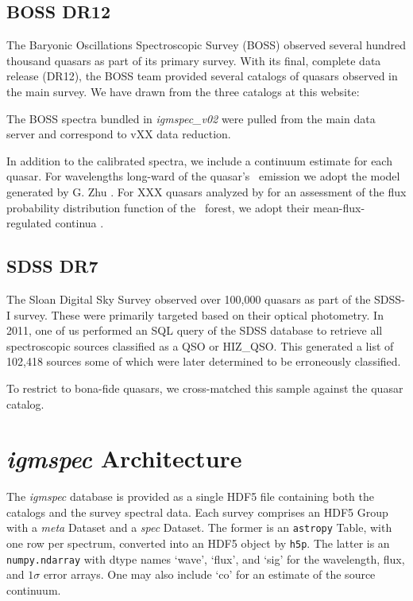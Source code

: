 \documentclass[12pt,preprint]{aastex}
\begin{document}
\subsection{BOSS DR12}

The Baryonic Oscillations Spectroscopic Survey (BOSS)
observed several hundred thousand quasars as part of its
primary survey.  With its final, complete data release
(DR12), the BOSS team provided several catalogs of quasars
observed in the main survey.  We have drawn from the three
catalogs at this website: 

The BOSS spectra bundled in {\it igmspec\_v02} were pulled
from the main data server and correspond to vXX data reduction.

In addition to the calibrated spectra, we include a
continuum estimate for each quasar.  For wavelengths
long-ward of the quasar's \lya\ emission we adopt
the model generated by G. Zhu 
\citep[see][for details on the algorithm]{zhu15}.
For XXX quasars analyzed by \cite{lee1X} for an assessment
of the flux probability distribution function of the 
\lya\ forest, we adopt their mean-flux-regulated continua
\citep{lee1Xb}.

\subsection{SDSS DR7}

The Sloan Digital Sky Survey observed over 100,000 quasars
as part of the SDSS-I survey.  These were primarily targeted
based on their optical photometry.  In 2011, one of us
performed an SQL query of the SDSS database to retrieve
all spectroscopic sources classified as a QSO or HIZ\_QSO. 
This generated a list of 102,418 sources some of which 
were later determined to be erroneously classified.

To restrict to bona-fide quasars, we cross-matched this
sample against the \cite{meyers1X} quasar catalog.

%

\section{{\it igmspec} Architecture}
\label{sec:arch}

The {\it igmspec} database is provided as a single HDF5 file
containing both the catalogs and the survey spectral data.  
Each survey comprises an HDF5 Group
with a {\it meta} Dataset and a {\it spec} Dataset.
The former is an {\tt astropy} Table, with one row per
spectrum, converted into an HDF5 object by {\tt h5p}.
The latter is an {\tt numpy.ndarray} 
with dtype names `wave', `flux', and `sig' for the
wavelength, flux, and $1\sigma$ error arrays.
One may also include `co' for an estimate of the source
continuum.  
\end{document}
